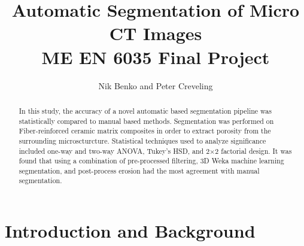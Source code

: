 \documentclass[11pt, twocolumn]{article}
\begin{document}
\title{ Automatic Segmentation of Micro CT Images  \\ \normalsize{ME EN 6035 Final Project}}
\author{Nik Benko and Peter Creveling}
\maketitle


\begin{abstract} 
In this study, the accuracy of a novel automatic based segmentation pipeline was statistically compared to manual based methods. Segmentation was performed on Fiber-reinforced ceramic matrix composites in order to extract porosity from the surrounding microscturcture. Statistical techniques used to analyze significance included one-way and two-way ANOVA, Tukey's HSD, and 2$\times$2 factorial design. It was found that using a combination of pre-processed filtering, 3D Weka machine learning segmentation, and post-process erosion had the most agreement with manual segmentation.
\end{abstract}

\section{Introduction and Background}
\end{document}

